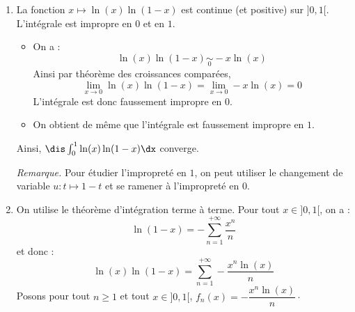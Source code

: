\documentclass[a4paper,10pt]{report}
\begin{document}
\begin{corr}
\begin{enumerate}
\item La fonction $x \mapsto \ln(x) \ln(1-x)$ est continue (et positive) sur $]0,1[$. L'intégrale est impropre en $0$ et en $1$.
\begin{itemize}
\item On a :
$$  \ln(x) \ln(1-x) \underset{0}{\sim} -x \ln(x)$$
Ainsi par théorème des croissances comparées,
$$ \lim_{x \rightarrow 0 }   \ln(x) \ln(1-x) =  \lim_{x \rightarrow 0 }  -x \ln(x) = 0$$
L'intégrale est donc faussement impropre en $0$.
\item On obtient de même que l'intégrale est faussement impropre en $1$.
\end{itemize}
Ainsi, $\dis \int_{0}^1 \ln(x) \ln(1-x) \dx$ converge.


\noindent \textit{Remarque.} Pour étudier l'impropreté en $1$, on peut utiliser le changement de variable $u : t \mapsto 1-t$ et se ramener à l'impropreté en $0$.


\medskip
\item On utilise le théorème d'intégration terme à terme. Pour tout $x \in ]0,1[$, on a :
$$ \ln(1-x) = - \sum_{n=1}^{+ \infty} \dfrac{x^n}{n}$$
et donc :
$$ \ln(x)\ln(1-x) = \sum_{n=1}^{+ \infty} - \dfrac{x^n \ln(x)}{n}$$
Posons pour tout $n \geq 1$ et tout $x \in ]0,1[$, $f_n(x)=  - \dfrac{x^n \ln(x)}{n} \cdot$


\end{enumerate}
\end{corr}
\end{document}
